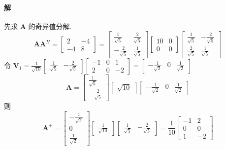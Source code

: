 \paragraph*{解} 先求 $\bm{A}$ 的奇异值分解.
$$
    \bm{AA}^H = \begin{bmatrix}
        2  & -4 \\
        -4 & 8
    \end{bmatrix} = \begin{bmatrix}
        \frac{1}{\sqrt{5}}  & \frac{2}{\sqrt{5}} \\
        -\frac{2}{\sqrt{5}} & \frac{1}{\sqrt{5}}
    \end{bmatrix}\begin{bmatrix}
        10 & 0 \\
        0  & 0
    \end{bmatrix}\begin{bmatrix}
        \frac{1}{\sqrt{5}} & -\frac{2}{\sqrt{5}} \\
        \frac{2}{\sqrt{5}} & \frac{1}{\sqrt{5}}
    \end{bmatrix}
$$
令 $\bm{V}_1 = \frac{1}{\sqrt{10}}\begin{bmatrix}
        \frac{1}{\sqrt{5}} & -\frac{2}{\sqrt{5}}
    \end{bmatrix}\begin{bmatrix}
        -1 & 0 & 1  \\
        2  & 0 & -2
    \end{bmatrix} = \begin{bmatrix}
        -\frac{1}{\sqrt{2}} & 0 & \frac{1}{\sqrt{2}}
    \end{bmatrix}$
$$
    \bm{A} = \begin{bmatrix}
        \frac{1}{\sqrt{5}} \\
        -\frac{2}{\sqrt{5}}
    \end{bmatrix}\begin{bmatrix}
        \sqrt{10}
    \end{bmatrix}\begin{bmatrix}
        -\frac{1}{\sqrt{2}} & 0 & \frac{1}{\sqrt{2}}
    \end{bmatrix}
$$
则
$$
    \bm{A}^+ = \begin{bmatrix}
        -\frac{1}{\sqrt{2}} \\
        0                   \\
        \frac{1}{\sqrt{2}}
    \end{bmatrix}\begin{bmatrix}
        \frac{1}{\sqrt{10}}
    \end{bmatrix}\begin{bmatrix}
        \frac{1}{\sqrt{5}} & -\frac{2}{\sqrt{5}}
    \end{bmatrix} = \frac{1}{10}\begin{bmatrix}
        -1 & 2  \\
        0  & 0  \\
        1  & -2
    \end{bmatrix}
$$